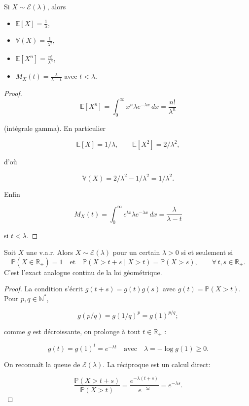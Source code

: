 \medskip

\begin{mdframed}
\begin{proposition}
Si $X\sim\mathcal{E}(\lambda)$, alors

\begin{itemize}
\item $\mathbb{E}[X]=\frac1\lambda$,
\item $\mathbb{V}(X)=\frac1{\lambda^2}$,
\item $\mathbb{E}[X^n]=\frac{n!}{\lambda^n}$,
\item $M_X(t)=\frac{\lambda}{\lambda-t}$ avec $t<\lambda$.
\end{itemize}
\end{proposition}
\end{mdframed}

\begin{proof}
$$
\mathbb{E}[X^n]=\int_0^\infty x^n\lambda e^{-\lambda x}\,dx=\frac{n!}{\lambda^n}
$$

(intégrale gamma). En particulier 

$$
\mathbb{E}[X]=1/\lambda, \qquad \mathbb{E}[X^2]=2/\lambda^2,
$$

d'où 

$$
\mathbb{V}(X)=2/\lambda^2-1/\lambda^2=1/\lambda^2. 
$$

Enfin

$$
M_X(t)=\int_0^\infty e^{tx}\lambda e^{-\lambda x}\,dx=\frac{\lambda}{\lambda-t}
$$

si $t<\lambda$.
\end{proof}

\medskip

\begin{mdframed}
\begin{proposition}
\label{prop:exp-memoire}
Soit $X$ une v.a.r. Alors $X\sim\mathcal{E}(\lambda)$ pour un certain $\lambda>0$ si
et seulement si
\[
  \mathbb{P}(X\in\mathbb{R}_+)=1
  \quad\text{et}\quad
  \mathbb{P}(X>t+s\mid X>t)=\mathbb{P}(X>s),\qquad \forall\,t,s\in\mathbb{R}_+.
\]
C'est l'exact analogue continu de la loi géométrique.
\end{proposition}
\end{mdframed}

\begin{proof}
La condition s'écrit $g(t+s)=g(t)g(s)$ avec $g(t)=\mathbb{P}(X>t)$. Pour $p,q\in\mathbb{N}^*$,

$$
g(p/q)=g(1/q)^p=g(1)^{p/q};
$$ 

comme $g$ est décroissante, on prolonge à tout $t\in\mathbb{R}_+$ : 

$$
g(t)=g(1)^t=e^{-\lambda t} \quad \text{avec} \quad \lambda=-\log g(1)\ge0.
$$ 

On reconnaît la queue de $\mathcal{E}(\lambda)$. La réciproque est un calcul direct:

$$
\frac{\mathbb{P}(X>t+s)}{\mathbb{P}(X>t)}=\frac{e^{-\lambda(t+s)}}{e^{-\lambda t}}=e^{-\lambda s}.
$$
\end{proof}

